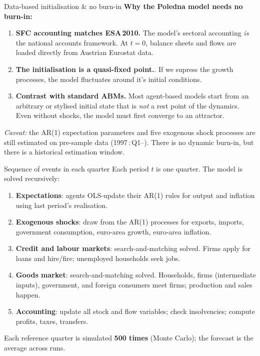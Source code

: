 \documentclass[9pt]{beamer}
\begin{document}
\begin{frame}{Data-based initialisation \& no burn-in}
    \textbf{Why the Poledna model needs no burn-in:}
    \vspace{0.6em}
    \begin{enumerate}
        \item[\textbf{1.}] \textbf{SFC accounting matches ESA\,2010.} The model's sectoral accounting \emph{is} the national accounts framework. At $t{=}0$, balance sheets and flows are loaded directly from Austrian Eurostat data.

        \vspace{0.3em}
        \item[\textbf{2.}] \textbf{The initialisation is a quasi-fixed point.}. If we supress the growth processes, the model fluctuates around it's initial conditions.

        \vspace{0.3em}
        \item[\textbf{3.}] \textbf{Contrast with standard ABMs.} Most agent-based models start from an arbitrary or stylised initial state that is \emph{not} a rest point of the dynamics. Even without shocks, the model must first converge to an attractor. 
    \end{enumerate}
    \vspace{0.4em}
    \footnotesize
    \emph{Caveat:} the AR(1) expectation parameters and five exogenous shock processes are still estimated on pre-sample data (1997\,:\,Q1--). There is no dynamic burn-in, but there is a historical estimation window.
\end{frame}

\begin{frame}{Sequence of events in each quarter}
    \small
    Each period $t$ is one quarter. The model is solved recursively:
    \begin{enumerate}
        \item[\textbf{(i)}] \textbf{Expectations}: agents OLS-update their AR(1) rules for output and inflation using last period's realisation.
        \item[\textbf{(ii)}] \textbf{Exogenous shocks}: draw from the AR(1) processes for exports, imports, government consumption, euro-area growth, euro-area inflation.
        \item[\textbf{(iii)}] \textbf{Credit and labour markets}: search-and-matching solved. Firms apply for loans and hire/fire; unemployed households seek jobs.
        \item[\textbf{(iv)}] \textbf{Goods market}: search-and-matching solved. Households, firms (intermediate inputs), government, and foreign consumers meet firms; production and sales happen.
        \item[\textbf{(v)}] \textbf{Accounting}: update all stock and flow variables; check insolvencies; compute profits, taxes, transfers.
    \end{enumerate}
    \vspace{0.3em}
    Each reference quarter is simulated \textbf{500 times} (Monte Carlo); the forecast is the average across runs.
\end{frame}
\end{document}
